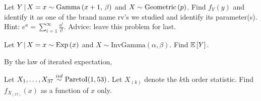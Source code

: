\documentclass[12pt]{article}
\begin{document}
\begin{enumerate}[(a)]


 Let $Y\,|\,X = x \sim \mathrm{Gamma}\left(x + 1,\,\beta\right)$ and $X \sim \mathrm{Geometric}\left(p\right)$. Find $f_Y(y)$ and identify it as one of the brand name rv's we studied and identify its parameter(s). Hint: $e^{a} = \displaystyle \sum_{i=1}^\infty \frac{a^i}{i!}$. Advice: leave this problem for last. 


\pagebreak
{} Let $Y\,|\,X = x \sim \mathrm{Exp}\left(x\right)$ and $X \sim \text{InvGamma}(\alpha,\beta)$. Find $\mathbb{E}\left[Y\right]$.

By the law of iterated expectation,


 Let $X_1, \ldots, X_{37} \iid \text{ParetoI}(1,53)$. Let $X_{(k)}$ denote the $k$th order statistic. Find $f_{X_{(17)}}(x)$ as a function of $x$ only. 


\end{enumerate}
\end{document}
